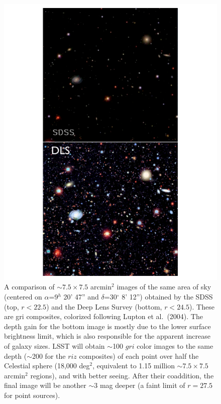 \documentclass{emulateapj}
\begin{document}
\begin{figure}
\hskip -0.8in
\includegraphics[width=1.5\hsize,clip]{panels1_2.pdf}
\caption{A comparison of $\sim7.5\times7.5$ arcmin$^2$ images of
the same area of sky (centered on $\alpha$=9$^h$ 20' 47'' and 
$\delta$=30$^\circ$ 8' 12'') obtained by the SDSS (top, $r<22.5$) and 
the Deep Lens Survey (bottom, $r<24.5$). These are gri composites,
colorized following Lupton et al.~(2004).  The depth gain for the bottom image
is mostly due to the lower surface brightness limit, which is also responsible 
for the apparent increase of galaxy sizes. LSST will obtain $\sim$100 $gri$ 
color images to the same depth ($\sim$200 for the $riz$ composites) of each point 
over half the Celestial sphere (18,000 deg$^2$, equivalent to 1.15 million $\sim7.5\times7.5$
arcmin$^2$ regions), and with better seeing. After their coaddition, the final 
image will be another $\sim3$ mag deeper (a faint limit of $r=27.5$ for point 
sources).} 
\label{Fig:panels1}
\end{figure}
\end{document}
